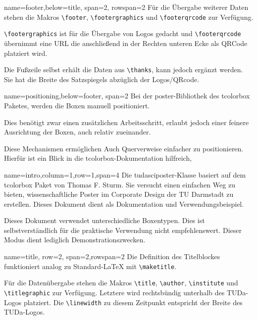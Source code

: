 \documentclass[
	accentcolor=9c,
	]{tudasciposter}
\newcommand{\tbs}{\textbackslash}
\let\code\texttt
\newcommand*{\macro}[1]{\code{\tbs#1}}
\let\pck\textsf
\let\cls\textsf
\begin{document}
\begin{tcbposter}[
	poster={
		columns=4,
		rows=7,
		spacing=1cm,
	},]
\begin{posterboxenv}[title=Fußzeile]{name=footer,below=title, span=2, rowspan=2 }
	Für die Übergabe weiterer Daten stehen die Makros \macro{footer}, \macro{footergraphics} und \macro{footerqrcode} zur Verfügung.
	
	\macro{footergraphics} ist für die Übergabe von Logos gedacht und \macro{footerqrcode} übernimmt eine URL die anschließend in der Rechten unteren Ecke als QRCode platziert wird.
	
	Die Fußzeile selbst erhält die Daten aus \macro{thanks}, kann jedoch ergänzt werden. Sie hat die Breite des Satzspiegels abzüglich der Logos/QRcode.
\end{posterboxenv}


\begin{posterboxenv}[title=Platzierung der Boxen]{name=positioning,below=footer, span=2}
Bei der \pck{poster}-Bibliothek des \pck{tcolorbox} Paketes, werden die Boxen manuell positioniert. 

Dies benötigt zwar einen zusätzlichen Arbeitsschritt, erlaubt jedoch einer feinere Ausrichtung der Boxen, auch relativ zueinander. 

Diese Mechanismen ermöglichen Auch Querverweise einfacher zu positionieren. Hierfür ist ein Blick in die \pck{tcolorbox}-Dokumentation hilfreich,
\end{posterboxenv}
	
\begin{posterboxenv}[title=Zusammenfassung]{name=intro,column=1,row=1,span=4}
	Die \cls{tudasciposter}-Klasse basiert auf dem \pck{tcolorbox} Paket von Thomas F. Sturm.
	Sie versucht einen einfachen Weg zu bieten, wissenschaftliche Poster im Corporate Design der TU Darmstadt zu erstellen. Dieses Dokument dient als Dokumentation und Verwendungsbeispiel.
	
	Dieses Dokument verwendet unterschiedliche Boxentypen. Dies ist selbstverständlich für die praktische Verwendung nicht empfehlenswert. Dieser Modus dient lediglich Demonstrationszwecken.
\end{posterboxenv}

\begin{posterboxenv}[title=Titelei]{name=title, row=2, span=2,rowspan=2}
	Die Definition des Titelblockes funktioniert analog zu Standard-\LaTeX{} mit \macro{maketitle}.
	
	Für die Datenübergabe stehen die Makros \macro{title}, \macro{author}, \macro{institute} und \macro{titlegraphic} zur Verfügung. Letztere wird rechtsbündig  unterhalb des TUDa-Logos platziert. Die \macro{linewidth} zu diesem Zeitpunkt entspricht der Breite des TUDa-Logos.
	

\end{posterboxenv}
\end{tcbposter}
\end{document}
